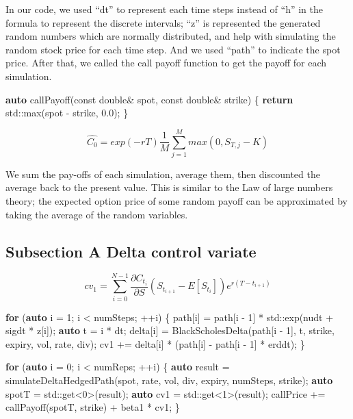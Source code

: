 \documentclass[11pt,]{article}
\newenvironment{Shaded}{\begin{snugshade}}{\end{snugshade}}
\newcommand{\KeywordTok}[1]{\textcolor[rgb]{0.13,0.29,0.53}{\textbf{#1}}}
\newcommand{\DataTypeTok}[1]{\textcolor[rgb]{0.13,0.29,0.53}{#1}}
\newcommand{\DecValTok}[1]{\textcolor[rgb]{0.00,0.00,0.81}{#1}}
\newcommand{\FloatTok}[1]{\textcolor[rgb]{0.00,0.00,0.81}{#1}}
\newcommand{\ControlFlowTok}[1]{\textcolor[rgb]{0.13,0.29,0.53}{\textbf{#1}}}
\newcommand{\BuiltInTok}[1]{#1}
\newcommand{\AttributeTok}[1]{\textcolor[rgb]{0.77,0.63,0.00}{#1}}
\newcommand{\NormalTok}[1]{#1}
\begin{document}
In our code, we used ``dt'' to represent each time steps instead of
``h'' in the formula to represent the discrete intervals; ``z'' is
represented the generated random numbers which are normally distributed,
and help with simulating the random stock price for each time step. And
we used ``path'' to indicate the spot price. After that, we called the
call payoff function to get the payoff for each simulation.

\begin{Shaded}
\begin{Highlighting}[]
\KeywordTok{auto}\NormalTok{ callPayoff(}\AttributeTok{const} \DataTypeTok{double}\NormalTok{& spot, }\AttributeTok{const} \DataTypeTok{double}\NormalTok{& strike)}
\NormalTok{\{}
    \ControlFlowTok{return} \BuiltInTok{std::}\NormalTok{max(spot - strike, }\FloatTok{0.0}\NormalTok{);}
\NormalTok{\}}
\end{Highlighting}
\end{Shaded}

\[
\hat{C_0} = exp(-rT)\frac{1}{M}\sum^M_{j=1} max(0, S_{T,j} - K)
\]

We sum the pay-offs of each simulation, average them, then discounted
the average back to the present value. This is similar to the Law of
large numbers theory; the expected option price of some random payoff
can be approximated by taking the average of the random variables.

\subsection{Subsection A Delta control
variate}\label{subsection-a-delta-control-variate}

\[
cv_1 = \sum^{N-1}_{i=0} \frac{\partial C_{t_i}}{\partial S}(S_{t_{i+1}}-E[S_{t_i}])e^{r(T-t_{i+1})}
\]

\begin{Shaded}
\begin{Highlighting}[]
\ControlFlowTok{for}\NormalTok{ (}\KeywordTok{auto}\NormalTok{ i = }\DecValTok{1}\NormalTok{; i < numSteps; ++i)}
\NormalTok{    \{}
\NormalTok{        path[i] = path[i - }\DecValTok{1}\NormalTok{] * }\BuiltInTok{std::}\NormalTok{exp(nudt + sigdt * z[i]);}
        \KeywordTok{auto}\NormalTok{ t = i * dt;}
\NormalTok{        delta[i] = BlackScholesDelta(path[i - }\DecValTok{1}\NormalTok{], t, strike, expiry, vol, rate, div);}
\NormalTok{        cv1 += delta[i] * (path[i] - path[i - }\DecValTok{1}\NormalTok{] * erddt);}
\NormalTok{    \}}

\ControlFlowTok{for}\NormalTok{ (}\KeywordTok{auto}\NormalTok{ i = }\DecValTok{0}\NormalTok{; i < numReps; ++i)}
\NormalTok{    \{}
        \KeywordTok{auto}\NormalTok{ result = simulateDeltaHedgedPath(spot, rate, vol, div, expiry, numSteps, strike);}
        \KeywordTok{auto}\NormalTok{ spotT = }\BuiltInTok{std::}\NormalTok{get<}\DecValTok{0}\NormalTok{>(result);}
        \KeywordTok{auto}\NormalTok{ cv1 = }\BuiltInTok{std::}\NormalTok{get<}\DecValTok{1}\NormalTok{>(result);}
\NormalTok{        callPrice += callPayoff(spotT, strike) + beta1 * cv1;}
\NormalTok{    \}}
\end{Highlighting}
\end{Shaded}
\end{document}
